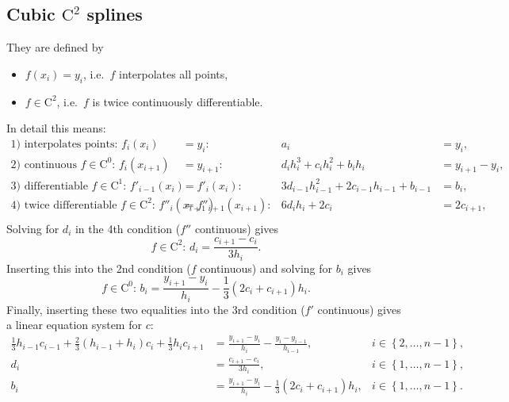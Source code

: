 \documentclass[11pt]{article}
\providecommand{\set}[1]{\left\{ #1 \right\}}
\providecommand{\set}[1]{\left\{ #1 \right\}}
\newcommand{\Co}{\mathrm{C}}
\theoremstyle{break}            %
\begin{document}
\subsection{Cubic $\Co^2$ splines}
They are defined by
\begin{itemize}
   \item $f(x_i) = y_i$, i.e.\ $f$ interpolates all points,
   \item $f\in\Co^2$, i.e.\ $f$ is twice continuously differentiable.
\end{itemize}
In detail this means:
\begin{equation*}
\begin{aligned}
   \text{1) interpolates points: } f_i(x_i) & = y_i: & 
    a_i & = y_i,\\
   \text{2) continuous } f\in\Co^0 \text{: } f_i(x_{i+1}) & =y_{i+1}: &
	d_i h_i^3 + c_i h_i^2 + b_i h_i & = y_{i+1}-y_i,\\
   \text{3) differentiable }f\in\Co^1 \text{: } f'_{i-1}(x_i) & =
    f'_i(x_i): &
    3 d_{i-1} h_{i-1}^2 + 2 c_{i-1} h_{i-1} + b_{i-1} & = b_i,\\
   \text{4) twice differentiable }f\in\Co^2 \text{: } f''_i(x_{i+1}) & =
    f''_{i+1}(x_{i+1}): &
    6 d_i h_i + 2 c_i & = 2 c_{i+1},\\
\end{aligned}
\end{equation*}
Solving for $d_i$ in the 4th condition ($f''$ continuous) gives
\begin{equation*}
    f\in\Co^2:\, d_i  =\frac{c_{i+1}-c_i}{3 h_i}.
\end{equation*}
Inserting this into the 2nd condition ($f$ continuous) and
solving for $b_i$ gives
\begin{equation*}
    f\in\Co^0:\, b_i  = \frac{y_{i+1}-y_i}{h_i} - \frac{1}{3} (2 c_i + c_{i+1}) h_i.
\end{equation*}
Finally, inserting these two equalities into the 3rd condition
($f'$ continuous) gives a linear equation system for $c$:
\begin{equation}
\label{eq:cubic_c2_spline_coeffs}
\boxed{
\begin{aligned}
 \frac{1}{3} h_{i-1} c_{i-1} + \frac{2}{3} (h_{i-1}+h_i) c_i
 + \frac{1}{3} h_i c_{i+1}   & =
 \frac{y_{i+1}-y_i}{h_i} -  \frac{y_i-y_{i-1}}{h_{i-1}},
 & i\in\set{2,\dots,n-1},\\
 d_i & =\frac{c_{i+1}-c_i}{3 h_i}, & i\in\set{1,\dots,n-1},\\
  b_i & = \frac{y_{i+1}-y_i}{h_i} - \frac{1}{3} (2 c_i + c_{i+1}) h_i,
 & i\in\set{1,\dots,n-1}.
\end{aligned}
}
\end{equation}
\end{document}
